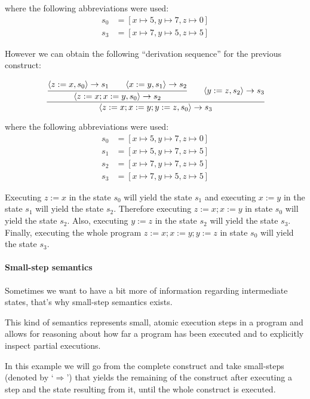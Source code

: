 where the following abbreviations were used:
\begin{align*}
s_{0} &= [x\mapsto5, y\mapsto7, z\mapsto0]\\
s_{3} &= [x\mapsto7, y\mapsto5, z\mapsto5]
\end{align*}

However we can obtain the following \enquote{derivation sequence} for the previous construct:

\begin{equation*}
\cfrac{
  \cfrac{\langle z:=x, s_{0}\rangle \rightarrow s_{1} \qquad \langle x:=y, s_{1} \rangle \rightarrow s_{2}}
    {\langle z:=x; x:=y, s_{0} \rangle \rightarrow s_{2}}
  \qquad
  \langle y:=z, s_{2} \rangle \rightarrow s_{3}
  }
  {\langle z:=x; x:=y; y:=z, s_{0} \rangle \rightarrow s_{3}}
\end{equation*}

where the following abbreviations were used:
\begin{align*}
s_{0} &= [x\mapsto5, y\mapsto7, z\mapsto0]\\
s_{1} &= [x\mapsto5, y\mapsto7, z\mapsto5]\\
s_{2} &= [x\mapsto7, y\mapsto7, z\mapsto5]\\
s_{3} &= [x\mapsto7, y\mapsto5, z\mapsto5]
\end{align*}

Executing $z:=x$ in the state $s_{0}$ will yield the state $s_{1}$ and executing $x:=y$ in the state $s_{1}$ will yield the state $s_{2}$.
Therefore executing $z:=x; x:=y$ in state $s_{0}$ will yield the state $s_{2}$.
Also, executing $y:=z$ in the state $s_{2}$ will yield the state $s_{3}$.
Finally, executing the whole program $z:=x; x:=y; y:=z$ in state $s_{0}$ will yield the state $s_{3}$.

\paragraph{Small-step semantics}

Sometimes we want to have a bit more of information regarding intermediate states, that's why small-step semantics exists.

This kind of semantics represents small, atomic execution steps in a program and allows for reasoning about how far a program has been executed and to explicitly inspect partial executions.~\parencite{nipkow}

In this example we will go from the complete construct and take small-steps (denoted by `$\Rightarrow$') that yields the remaining of the construct after executing a step and the state resulting from it, until the whole construct is executed.

